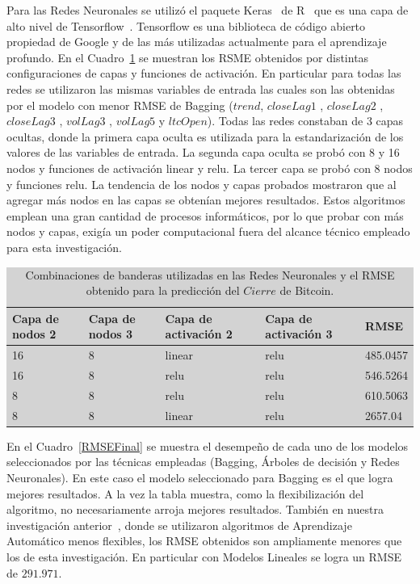 \documentclass[a4paper,12pt,twocolumn]{article}
\begin{document}
Para las Redes Neuronales se utilizó el paquete Keras~\cite{keras} de R~\cite{r} que es una capa de alto nivel de Tensorflow~\cite{tensorflow}. Tensorflow es una biblioteca de código abierto propiedad de Google y de las más utilizadas actualmente para el aprendizaje profundo. En el Cuadro~\ref{redesModelTuning} se muestran los RSME obtenidos por distintas configuraciones de capas y funciones de activación. En particular para todas las redes se utilizaron las mismas variables de entrada  las cuales son las obtenidas por el modelo con menor RMSE de Bagging ($trend$, $closeLag1$ , $closeLag2$ , $closeLag3$ ,  $volLag3$ , $volLag5$ y $ltcOpen$). Todas las redes constaban de 3 capas ocultas, donde la primera capa oculta es utilizada para la estandarización de los valores de las variables de entrada. La segunda capa oculta se probó con 8 y 16 nodos y funciones de activación linear y relu. La  tercer capa se probó con 8 nodos y funciones relu. La tendencia de los nodos y capas probados mostraron que al agregar más nodos en las capas se obtenían mejores resultados. Estos algoritmos emplean una gran cantidad de procesos informáticos, por lo que probar con más nodos y capas, exigía un poder computacional fuera del alcance técnico empleado para esta investigación. 

\begin{table}[!hbt]
\centering
\caption{Combinaciones de banderas utilizadas en las Redes Neuronales y el RMSE obtenido para la predicción del $Cierre$ de Bitcoin. }
\label{redesModelTuning}
\begingroup\setlength{\fboxsep}{0pt}
\colorbox{lightgray}{%
\begin{tabular}{|l|l|l|l|l|}
\hline Capa de nodos 2 & Capa de nodos 3 & Capa de activación 2 & Capa de activación 3 & RMSE \\
\hline 16& 8 & linear & relu  &  485.0457\\
\hline 16& 8 & relu & relu  &  546.5264\\
\hline 8& 8 & relu & relu  &  610.5063\\
\hline 8& 8 & linear & relu  & 2657.04\\
\hline
\end{tabular}%
}\endgroup
\end{table}

En el Cuadro~\ref{RMSEFinal} se muestra el desempeño de cada uno de los modelos seleccionados por las técnicas empleadas (Bagging, Árboles de decisión y Redes Neuronales). En este caso el modelo seleccionado para Bagging es el que logra mejores resultados. A la vez la tabla muestra, como la flexibilización del algoritmo, no necesariamente arroja mejores resultados. También en nuestra investigación anterior~\cite{paper1}, donde se utilizaron algoritmos de Aprendizaje Automático menos flexibles, los RMSE obtenidos son ampliamente menores que los de esta investigación. En particular con Modelos Lineales se logra un RMSE de $291.971$.
\end{document}
